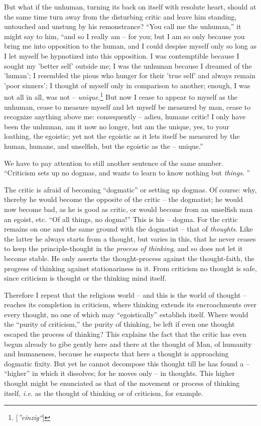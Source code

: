 \documentclass[12pt,a4paper]{book}
\begin{document}
But what if the unhuman, turning its back on itself with resolute heart, 
should at the same time turn away from the disturbing critic and leave him 
standing, untouched and unstung by his remonstrance? ``You call me the 
unhuman,'' it might say to him, ``and so I really am -- for you; but I am so 
only because you bring me into opposition to the human, and I could despise 
myself only so long as I let myself be hypnotized into this opposition. I was 
contemptible because I sought my 'better self' outside me; I was the unhuman 
because I dreamed of the 'human'; I resembled the pious who hunger for their 
'true self' and always remain 'poor sinners'; I thought of myself only in 
comparison to another; enough, I was not all in all, was not -- 
\textit{unique}.\footnote{[\textit{''einzig``}]} But now I cease to appear 
to myself as the unhuman, cease to measure myself and let myself be measured 
by man, cease to recognize anything above me: consequently -- adieu, humane 
critic! I only have been the unhuman, am it now no longer, but am the unique, 
yes, to your loathing, the egoistic; yet not the egoistic as it lets itself be 
measured by the human, humane, and unselfish, but the egoistic as the -- 
unique.''

We have to pay attention to still another sentence of the same number. 
``Criticism sets up no dogmas, and wants to learn to know nothing but 
\textit{things}. ''

The critic is afraid of becoming ``dogmatic'' or setting up dogmas. Of 
course: why, thereby he would become the opposite of the critic -- the 
dogmatist; he would now become bad, as he is good as critic, or would become 
from an unselfish man an egoist, etc. ``Of all things, no dogma!'' This is 
his -- dogma. For the critic remains on one and the same ground with the 
dogmatist -- that of \textit{thoughts}. Like the latter he always starts from 
a thought, but varies in this, that he never ceases to keep the 
principle-thought in the \textit{process of thinking}, and so does not let it 
become stable. He only asserts the thought-process against the thought-faith, 
the progress of thinking against stationariness in it. From criticism no 
thought is safe, since criticism is thought or the thinking mind itself.

Therefore I repeat that the religious world -- and this is the world of 
thought -- reaches its completion in criticism, where thinking extends its 
encroachments over every thought, no one of which may ``egoistically'' 
establish itself. Where would the ``purity of criticism,'' the purity of 
thinking, be left if even one thought escaped the process of thinking? This 
explains the fact that the critic has even begun already to gibe gently here 
and there at the thought of Man, of humanity and humaneness, because he 
suspects that here a thought is approaching dogmatic fixity. But yet he cannot 
decompose this thought till he has found a -- ``higher'' in which it 
dissolves; for he moves only -- in thoughts. This higher thought might be 
enunciated as that of the movement or process of thinking itself, 
\textit{i.e.} as the thought of thinking or of criticism, for example.
\end{document}
